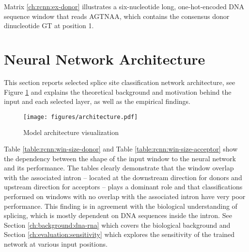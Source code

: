 Matrix \ref{ch:rcnn:ex-donor} illustrates a six-nucleotide long,
one-hot-encoded DNA sequence window that reads AGTNAA, which contains the
consensus donor dinucleotide GT at position 1.

\section{\label{ch:rcnn:architecture}Neural Network Architecture}

This section reports selected splice site classification network architecture,
see Figure \ref{fig:rcnn:architecture} and explains the theoretical background
and motivation behind the input and each selected layer, as well as the
empirical findings.

\begin{figure}
  \centering
  \texttt{[image: figures/architecture.pdf]}
  \caption{Model architecture visualization}
  \label{fig:rcnn:architecture}
\end{figure}

Table \ref{table:rcnn:win-size-donor} and Table
\ref{table:rcnn:win-size-acceptor} show the dependency between the shape of the
input window to the neural network and its performance. The tables clearly
demonstrate that the window overlap with the associated intron -- located at
the downstream direction for donors and upstream direction for acceptors --
plays a dominant role and that classifications performed on windows with no
overlap with the associated intron have very poor performance. This finding is
in agreement with the biological understanding of splicing, which is mostly
dependent on DNA sequences inside the intron. See Section
\ref{ch:background:dna-rna} which covers the biological background and Section
\ref{ch:evaluation:sensitivity} which explores the sensitivity of the trained
network at various input positions.

